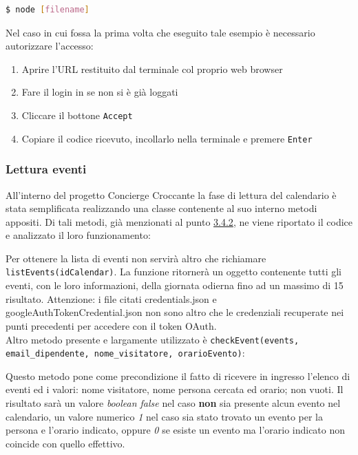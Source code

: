 \begin{itemize}
	\begin{lstlisting}[language=bash]
		$ node [filename]
	\end{lstlisting}
	Nel caso in cui fossa la prima volta che eseguito tale esempio è necessario autorizzare l'accesso:
	\begin{enumerate}
		\item Aprire l'URL restituito dal terminale col proprio web browser
		\item Fare il login in se non si è già loggati
		\item Cliccare il bottone \texttt{Accept}
		\item Copiare il codice ricevuto, incollarlo nella terminale e premere \texttt{Enter}
	\end{enumerate}
\end{itemize}
\subsubsection{Lettura eventi}
All'interno del progetto Concierge Croccante la fase di lettura del calendario è stata semplificata realizzando una classe contenente al suo interno metodi appositi. Di tali metodi, già menzionati al punto \hyperref[utils]{3.4.2}, ne viene riportato il codice e analizzato il loro funzionamento:

Per ottenere la lista di eventi non servirà altro che richiamare \texttt{listEvents(idCalendar)}. La funzione ritornerà un oggetto contenente tutti gli eventi, con le loro informazioni, della giornata odierna fino ad un massimo di 15 risultato. Attenzione: i file citati credentials.json e googleAuthTokenCredential.json non sono altro che le credenziali recuperate nei punti precedenti per accedere con il token OAuth.
\\[0.5cm]
Altro metodo presente e largamente utilizzato è \texttt{checkEvent(events, email\_dipendente, nome\_visitatore, orarioEvento)}:

Questo metodo pone come precondizione il fatto di ricevere in ingresso l'elenco di eventi ed i valori: nome visitatore, nome persona cercata ed orario; non vuoti. Il risultato sarà un valore \textit{boolean false} nel caso \textbf{non} sia presente alcun evento nel calendario, un valore numerico \textit{1} nel caso sia stato trovato un evento per la persona e l'orario indicato, oppure \textit{0} se esiste un evento ma l'orario indicato non coincide con quello effettivo.

\newpage
